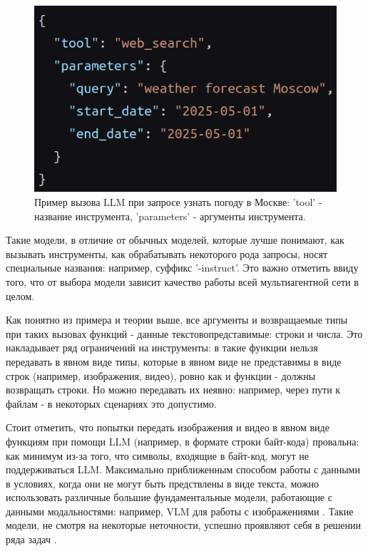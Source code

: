 \begin{figure}
    \center
	\includegraphics[scale=0.36]{sources/json_tool_invoke.png}
	\caption{Пример вызова LLM при запросе узнать погоду в Москве: 'tool' - название 
инструмента, 'parameters' - аргументы инструмента.} 
	\label{fig:ch2:tool_invoke}  
\end{figure}

Такие модели, в отличие от обычных моделей, которые лучше понимают, как вызывать 
инструменты, как обрабатывать некоторого рода запросы, носят специальные названия:
например, суффикс '-instruct'. Это важно отметить ввиду того, что от выбора модели 
зависит качество работы всей мультиагентной сети в целом. 

Как понятно из примера и теории выше, все аргументы и возвращаемые типы при
таких вызовах функций - данные текстовопредставимые: строки и числа. Это накладывает
ряд ограничений на инструменты: в такие функции нельзя передавать в явном виде типы,
которые в явном виде не представимы в виде строк (например, изображения, видео), 
ровно как и функции - должны возвращать строки. Но можно передавать их неявно: например,
через пути к файлам - в некоторых сценариях это допустимо.

Стоит отметить, что попытки передать изображения и видео в явном виде функциям при помощи 
LLM (например, в формате строки байт-кода) провальна: как минимум из-за того, что символы,
входящие в байт-код, могут не поддерживаться LLM. Максимально приближенным способом работы
с данными в условиях, когда они не могут быть предствлены в виде текста, можно использовать
различные большие фундаментальные модели, работающие с данными модальностями: например, 
VLM для работы с изображениями \cite{pixtral}. Такие модели, не смотря на некоторые
неточности, успешно проявляют себя в решении ряда задач \cite{vlm_in_charts}.

